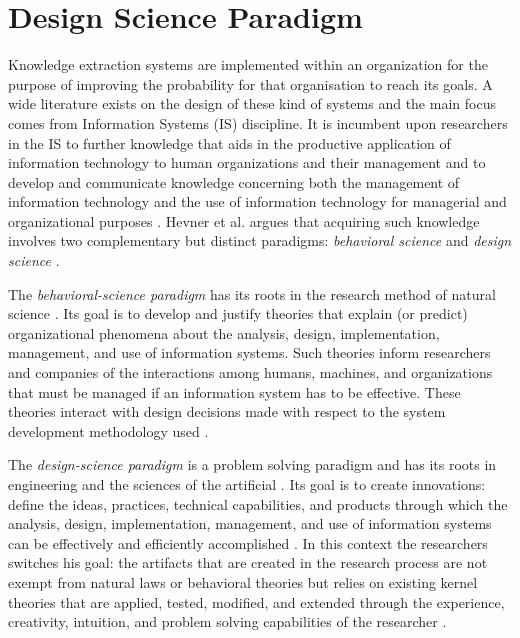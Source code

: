 \documentclass[b5paper,]{book}
\theoremstyle{definition}
\theoremstyle{definition}
\theoremstyle{definition}
\theoremstyle{remark}
\begin{document}
\section{Design Science Paradigm}\label{introdesres}

Knowledge extraction systems are implemented within an organization for
the purpose of improving the probability for that organisation to reach
its goals. A wide literature exists on the design of these kind of
systems and the main focus comes from Information Systems (IS)
discipline. It is incumbent upon researchers in the IS to further
knowledge that aids in the productive application of information
technology to human organizations and their management
\citep{edit2002info} and to develop and communicate knowledge concerning
both the management of information technology and the use of information
technology for managerial and organizational purposes
\citep{Zmud1997edit}. Hevner et al. \citep{bichler2006design} argues
that acquiring such knowledge involves two complementary but distinct
paradigms: \emph{behavioral science} and \emph{design science}
\citep{march1995design}.

The \emph{behavioral-science paradigm} has its roots in the research
method of natural science
\citep{makadok2018practical, colquitt2007trends}. Its goal is to develop
and justify theories that explain (or predict) organizational phenomena
\citep{zahra2009maximizing} about the analysis, design, implementation,
management, and use of information systems. Such theories inform
researchers and companies of the interactions among humans, machines,
and organizations that must be managed if an information system has to
be effective. These theories interact with design decisions made with
respect to the system development methodology used
\citep{fini2018collaborative}.

The \emph{design-science paradigm} is a problem solving paradigm and has
its roots in engineering and the sciences of the artificial
\citep{simon1996sciences}. Its goal is to create innovations: define the
ideas, practices, technical capabilities, and products through which the
analysis, design, implementation, management, and use of information
systems can be effectively and efficiently accomplished
\citep{denning1997new, tsichritzis1997dynamics}. In this context the
researchers switches his goal: the artifacts that are created in the
research process are not exempt from natural laws or behavioral theories
but relies on existing kernel theories that are applied, tested,
modified, and extended through the experience, creativity, intuition,
and problem solving capabilities of the researcher
\citep{george2016big, madhavji2015big, markus2002design, walls1992building}.
\end{document}
